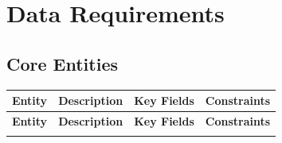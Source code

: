 \documentclass[12pt,a4paper]{article}
\begin{document}
\newpage
\section{Data Requirements}

\subsection{Core Entities}

\begin{longtable}{@{}L{2.8cm}L{3.5cm}L{4cm}L{5cm}@{}}
    \textbf{Entity} & \textbf{Description} & \textbf{Key Fields} & \textbf{Constraints} \\
  \midrule
  \endfirsthead

    \textbf{Entity} & \textbf{Description} & \textbf{Key Fields} & \textbf{Constraints} \\
  \midrule
  \endhead

  \endfoot


\end{longtable}
\end{document}
